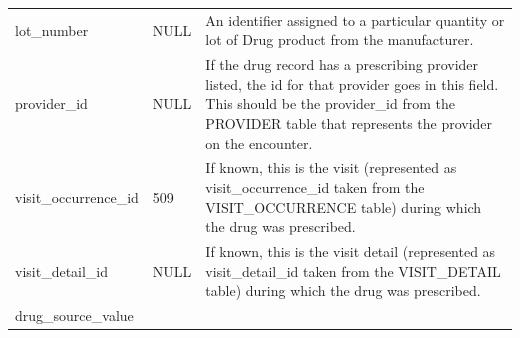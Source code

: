 \documentclass[]{book}
\begin{document}
\begin{longtable}[]{@{}lll@{}}
\begin{minipage}[t]{0.30\columnwidth}
lot\_number\strut
\end{minipage} & \begin{minipage}[t]{0.14\columnwidth}\raggedright
NULL\strut
\end{minipage} & \begin{minipage}[t]{0.48\columnwidth}\raggedright
An identifier assigned to a particular quantity or lot of Drug product from the manufacturer.\strut
\end{minipage}\tabularnewline
\begin{minipage}[t]{0.30\columnwidth}\raggedright
provider\_id\strut
\end{minipage} & \begin{minipage}[t]{0.14\columnwidth}\raggedright
NULL\strut
\end{minipage} & \begin{minipage}[t]{0.48\columnwidth}\raggedright
If the drug record has a prescribing provider listed, the id for that provider goes in this field. This should be the provider\_id from the PROVIDER table that represents the provider on the encounter.\strut
\end{minipage}\tabularnewline
\begin{minipage}[t]{0.30\columnwidth}\raggedright
visit\_occurrence\_id\strut
\end{minipage} & \begin{minipage}[t]{0.14\columnwidth}\raggedright
509\strut
\end{minipage} & \begin{minipage}[t]{0.48\columnwidth}\raggedright
If known, this is the visit (represented as visit\_occurrence\_id taken from the VISIT\_OCCURRENCE table) during which the drug was prescribed.\strut
\end{minipage}\tabularnewline
\begin{minipage}[t]{0.30\columnwidth}\raggedright
visit\_detail\_id\strut
\end{minipage} & \begin{minipage}[t]{0.14\columnwidth}\raggedright
NULL\strut
\end{minipage} & \begin{minipage}[t]{0.48\columnwidth}\raggedright
If known, this is the visit detail (represented as visit\_detail\_id taken from the VISIT\_DETAIL table) during which the drug was prescribed.\strut
\end{minipage}\tabularnewline
\begin{minipage}[t]{0.30\columnwidth}\raggedright
drug\_source\_value\strut
\end{minipage} & \begin{minipage}[t]{0.14\columnwidth}\raggedright

\end{minipage}
\end{longtable}
\end{document}
